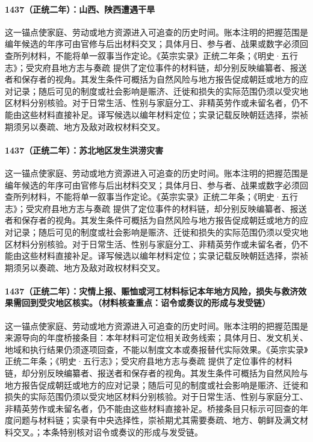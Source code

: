 \paragraph{1437（正统二年）：山西、陕西遭遇干旱} 这一锚点使家庭、劳动或地方资源进入可追查的历史时间。账本注明的把握范围是编年候选的年序可由官修与后出材料交叉；具体月日、参与者、战果或数字必须回查所列材料，不能将单一叙事当作定论。《英宗实录》正统二年条；《明史·五行志》；受灾府县地方志与奏疏 提供了定位事件的材料链，却分别反映编纂者、报送者和保存者的视角。其发生条件可概括为自然风险与地方报告促成朝廷或地方的应对记录；随后可见的制度或社会影响是赈济、迁徙和损失的实际范围仍须以受灾地区材料分别核验。对于日常生活、性别与家庭分工、非精英劳作或未留名者，仍不能由这些材料直接补足。译写候选以编年材料定位；实录记载反映朝廷选择，崇祯期须另以奏疏、地方及敌对政权材料交叉。

\paragraph{1437（正统二年）：苏北地区发生洪涝灾害} 这一锚点使家庭、劳动或地方资源进入可追查的历史时间。账本注明的把握范围是编年候选的年序可由官修与后出材料交叉；具体月日、参与者、战果或数字必须回查所列材料，不能将单一叙事当作定论。《英宗实录》正统二年条；《明史·五行志》；受灾府县地方志与奏疏 提供了定位事件的材料链，却分别反映编纂者、报送者和保存者的视角。其发生条件可概括为自然风险与地方报告促成朝廷或地方的应对记录；随后可见的制度或社会影响是赈济、迁徙和损失的实际范围仍须以受灾地区材料分别核验。对于日常生活、性别与家庭分工、非精英劳作或未留名者，仍不能由这些材料直接补足。译写候选以编年材料定位；实录记载反映朝廷选择，崇祯期须另以奏疏、地方及敌对政权材料交叉。

\paragraph{1437（正统二年）：灾情上报、赈恤或河工材料标记本年地方风险，损失与救济效果需回到受灾地区核实。（材料核查重点：诏令或奏议的形成与发受链）} 这一锚点使家庭、劳动或地方资源进入可追查的历史时间。账本注明的把握范围是来源导向的年度桥接条目：本年材料可定位相关政务线索；具体月日、发文机关、地域和执行结果仍须逐项回查，不能以制度文本或奏报替代实际效果。《英宗实录》正统二年条；《明史·五行志》；受灾府县地方志与奏疏 提供了定位事件的材料链，却分别反映编纂者、报送者和保存者的视角。其发生条件可概括为自然风险与地方报告促成朝廷或地方的应对记录；随后可见的制度或社会影响是赈济、迁徙和损失的实际范围仍须以受灾地区材料分别核验。对于日常生活、性别与家庭分工、非精英劳作或未留名者，仍不能由这些材料直接补足。桥接条目只标示可回查的年度问题与材料链；实录有中央选择性，崇祯期尤其需要奏疏、地方、朝鲜及满文材料交叉。；本条特别核对诏令或奏议的形成与发受链。

